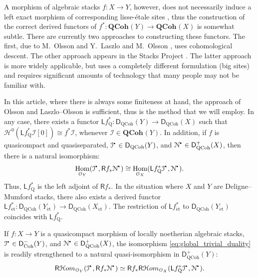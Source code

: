 \documentclass{amsart}
\theoremstyle{plain}
\theoremstyle{definition}
\theoremstyle{remark}
\numberwithin{equation}{section}
\newcommand{\Orb}{\mathcal{O}}
\newcommand{\QCOHB}{\mathbf{QCoh}}
\newcommand{\QCOH}[2][]{\QCOHB^{#1}({#2})}
\newcommand{\et}{\mathrm{\acute{e}t}}
\DeclareMathOperator{\Hom}{Hom}
\newcommand{\COHO}[1]{\mathcal{H}^{{#1}}}
\newcommand{\RDERF}{\mathsf{R}}
\newcommand{\LDERF}{\mathsf{L}}
\newcommand{\DCAT}{\mathsf{D}}
\newcommand{\SHom}{\mathcal{H}om}
\newcommand{\SRHom}{\RDERF\SHom}
\newcommand{\homotopic}{\simeq}
\newcommand{\shv}[1]{\mathcal{{#1}}}
\newcommand{\QCPSH}[1]{{#1}_{*}}
\newcommand{\QCPBK}[1]{{#1}_{\mathrm{Q}}^*}
\newcommand{\DQCOH}{\DCAT_{\mathrm{QCoh}}}
\newcommand{\DCOH}{\DCAT_{\mathrm{Coh}}}
\newcommand{\sbt}{\,\begin{picture}(-1,-1)(0,-2)\circle*{1.5}\end{picture}\ }
\newcommand{\cplx}[1]{\shv{{#1}}^{\sbt}}
\begin{document}
A morphism of algebraic stacks $f : X \to Y$, however, does not
necessarily induce a left exact morphism of corresponding
lisse-\'etale sites \cite[5.3.12]{MR1963494}, thus the construction of
the correct derived functors of $f^* : \QCOH{Y} \to \QCOH{X}$ is
somewhat subtle. There are currently two approaches to constructing
these functors. The first, due to M.~Olsson \cite{MR2312554} and
Y.~Laszlo and M.~Olsson \cite{MR2434692}, uses cohomological
descent. The other approach appears in the Stacks Project
\cite{stacks-project}. The latter approach is more widely applicable,
but uses a completely different formulation (big sites) and requires
significant amounts of technology that many people may not be familiar
with. 

In this article, where there is always some finiteness at hand,
the approach of Olsson and Laszlo--Olsson is sufficient,
thus is the method that we will employ. In any case, there exists a
functor $\LDERF \QCPBK{f} :\DQCOH(Y) \to \DQCOH(X)$ such that
$\COHO{0}(\LDERF \QCPBK{f} \shv{I}[0]) \cong f^*\shv{I}$, whenever
$\shv{I} \in \QCOH{Y}$. In addition, if $f$ is quasicompact and quasiseparated, $\cplx{I}
\in \DQCOH(Y)$, and $\cplx{N} \in \DQCOH^+(X)$, then there is a
natural isomorphism:
\begin{equation}
\Hom_{\Orb_Y}(\cplx{I},\RDERF \QCPSH{f}
\cplx{N}) \cong \Hom_{\Orb_X}(\LDERF \QCPBK{f}
\cplx{I},\cplx{N}).\label{eq:global_trivial_duality}  
\end{equation}
Thus, $\LDERF \QCPBK{f}$ is the left adjoint of $\RDERF f_*$.  
In the situation where $X$ and $Y$ are Deligne--Mumford stacks, there
also exists a derived functor $\LDERF f_{\et}^* : \DQCOH(Y_{\et}) \to
\DQCOH(X_{\et})$. The restriction of $\LDERF f_{\et}^*$ to
$\DQCOH(Y_{\et})$ coincides with $\LDERF
\QCPBK{f}$. 

If $f : X \to Y$  is a quasicompact morphism of locally
noetherian algebraic stacks, $\cplx{I} \in \DCOH^-(Y)$, and $\cplx{N}
\in \DQCOH^+(X)$, the isomorphism \eqref{eq:global_trivial_duality} is
readily strengthened to a natural quasi-isomorphism
in $\DQCOH^+(Y)$:
\begin{equation}
  \label{eq:sheaf_trivial_duality}
  \SRHom_{\Orb_Y}(\cplx{I},\RDERF \QCPSH{f}\cplx{N}) \homotopic \RDERF
  f_* \SRHom_{\Orb_X}(\LDERF \QCPBK{f} \cplx{I},\cplx{N}). 
\end{equation}
 
\end{document}
